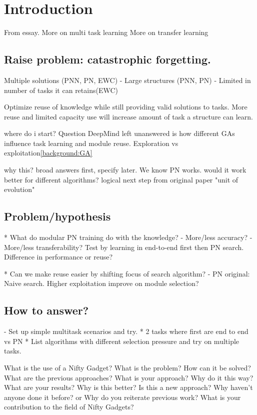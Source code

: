 \chapter{Introduction}
From essay. 
More on multi task learning
More on transfer learning

\section{Raise problem: catastrophic forgetting.}
Multiple solutions (PNN, PN, EWC)
- Large structures (PNN, PN)
- Limited in number of tasks it can retains(EWC)

Optimize reuse of knowledge while still providing valid solutions to tasks. More reuse and limited capacity use will increase amount of task a structure can learn. 

where do i start?
Question DeepMind left unanswered is how different GAs influence task learning and module reuse. 
Exploration vs exploitation\ref{background:GA}

why this? broad answers first, specify later. 
We know PN works. would it work better for different algorithms?
logical next step from original paper "unit of evolution"

\section{Problem/hypothesis}
* What do modular PN training do with the knowledge? 
- More/less accuracy?
- More/less transferability? 
Test by learning in end-to-end first then PN search. 
Difference in performance or reuse?

* Can we make reuse easier by shifting focus of search algorithm?
- PN original: Naive search. Higher exploitation improve on module selection?

\section{How to answer?}
- Set up simple multitask scenarios and try. 
* 2 tasks where first are end to end vs PN
* List algorithms with different selection pressure and try on multiple tasks. 

\iffalse
    What is the use of a Nifty Gadget? 
    What is the problem? 
    How can it be solved? 
    What are the previous approaches? 
    What is your approach? 
    Why do it this way? 
    What are your results? 
    Why is this better? 
    Is this a new approach? 
    Why haven't anyone done it before? 
    or
    Why do you reiterate previous work? 
    What is your contribution to the field of Nifty Gadgets? 
    
